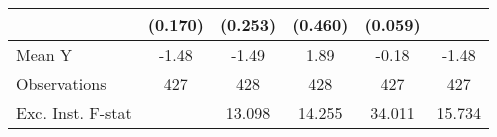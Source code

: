 {\begin{tabular}{l*{5}{c}}
            &     (0.170)         &     (0.253)         &     (0.460)         &     (0.059)         &                     \\
\midrule
Mean Y      &       -1.48         &       -1.49         &        1.89         &       -0.18         &       -1.48         \\
Observations&         427         &         428         &         428         &         427         &         427         \\
Exc. Inst. F-stat&                     &      13.098         &      14.255         &      34.011         &      15.734         \\
\bottomrule
\end{tabular}
}
